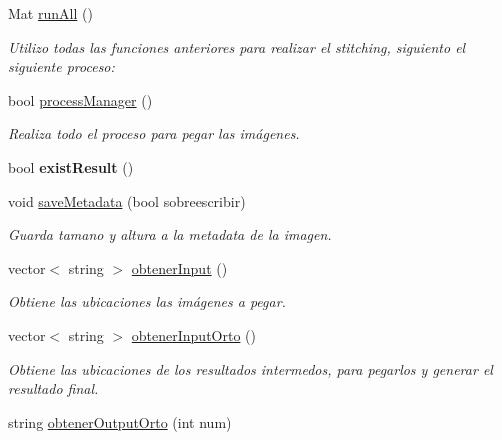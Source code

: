 \begin{DoxyCompactItemize}
Mat \mbox{\hyperlink{classuav_1_1Stitcher_a0b78aba00328166db74d46884485f3bd}{run\+All}} ()
\begin{DoxyCompactList}\small\item\em Utilizo todas las funciones anteriores para realizar el stitching, siguiento el siguiente proceso\+: \end{DoxyCompactList}\item 
\mbox{\label{classuav_1_1Stitcher_ad73d5edb258b0926332c582af66e2c23}} 
bool \mbox{\hyperlink{classuav_1_1Stitcher_ad73d5edb258b0926332c582af66e2c23}{process\+Manager}} ()
\begin{DoxyCompactList}\small\item\em Realiza todo el proceso para pegar las imágenes. \end{DoxyCompactList}\item 
\mbox{\label{classuav_1_1Stitcher_a6817cdd546ecfa173b4a51e450a3f568}} 
bool {\bfseries exist\+Result} ()
\item 
\mbox{\label{classuav_1_1Stitcher_a4b1c5c7016837e4ece178a5b9360a57b}} 
void \mbox{\hyperlink{classuav_1_1Stitcher_a4b1c5c7016837e4ece178a5b9360a57b}{save\+Metadata}} (bool sobreescribir)
\begin{DoxyCompactList}\small\item\em Guarda tamano y altura a la metadata de la imagen. \end{DoxyCompactList}\item 
vector$<$ string $>$ \mbox{\hyperlink{classuav_1_1Stitcher_a33521f40ecd0a4b57e3433b32c33f872}{obtener\+Input}} ()
\begin{DoxyCompactList}\small\item\em Obtiene las ubicaciones las imágenes a pegar. \end{DoxyCompactList}\item 
vector$<$ string $>$ \mbox{\hyperlink{classuav_1_1Stitcher_a4a31cc35b3bc69697cdaa8094d4490b8}{obtener\+Input\+Orto}} ()
\begin{DoxyCompactList}\small\item\em Obtiene las ubicaciones de los resultados intermedos, para pegarlos y generar el resultado final. \end{DoxyCompactList}\item 
string \mbox{\hyperlink{classuav_1_1Stitcher_a2f5433b17c42c874359f7f92148b4ee2}{obtener\+Output\+Orto}} (int num)

\end{DoxyCompactItemize}
